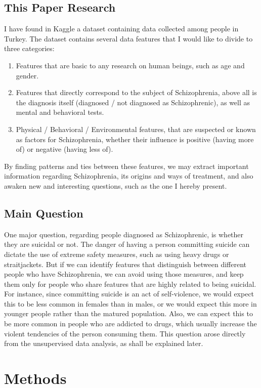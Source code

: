 \documentclass{article}
\begin{document}
\subsection{This Paper Research}
I have found in Kaggle a dataset containing data collected among people in Turkey. The dataset contains several data features that I would like to divide to three categories:
\begin{enumerate}
    \item Features that are basic to any research on human beings, such as age and gender.
    \item Features that directly correspond to the subject of Schizophrenia, above all is the diagnosis itself (diagnosed / not diagnosed as Schizophrenic), as well as mental and behavioral tests.
    \item Physical / Behavioral / Environmental features, that are suspected or known as factors for Schizophrenia, whether their influence is positive (having more of) or negative (having less of).
\end{enumerate}
By finding patterns and ties between these features, we may extract important information regarding Schizophrenia, its origins and ways of treatment, and also awaken new and interesting questions, such as the one I hereby present.
\subsection{Main Question}
One major question, regarding people diagnosed as Schizophrenic, is whether they are suicidal or not. The danger of having a person committing suicide can dictate the use of extreme safety measures, such as using heavy drugs or straitjackets. But if we can identify features that distinguish between different people who have Schizophrenia, we can avoid using those measures, and keep them only for people who share features that are highly related to being suicidal. 
For instance, since committing suicide is an act of self-violence, we would expect this to be less common in females than in males, or we would expect this more in younger people rather than the matured population. Also, we can expect this to be more common in people who are addicted to drugs, which usually increase the violent tendencies of the person consuming them.
This question arose directly from the unsupervised data analysis, as shall be explained later.
\section{Methods}
\end{document}
